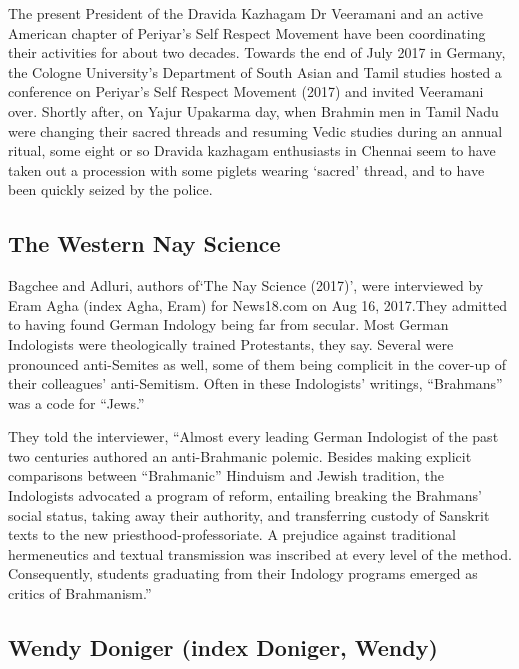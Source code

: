 \item The present President of the Dravida Kazhagam Dr Veeramani and an active American chapter of Periyar’s Self Respect Movement have been coordinating their activities for about two decades. Towards the end of July 2017 in Germany, the Cologne University’s Department of South Asian and Tamil studies hosted a conference on Periyar’s Self Respect Movement (2017) and invited Veeramani over. Shortly after, on Yajur Upakarma day, when Brahmin men in Tamil Nadu were changing their sacred threads and resuming Vedic studies during an annual ritual, some eight or so Dravida kazhagam enthusiasts in Chennai seem to have taken out a procession with some piglets wearing ‘sacred’ thread, and to have been quickly seized by the police.



\subsection{The Western Nay Science}

\item Bagchee and Adluri, authors of‘The Nay Science (2017)’, were interviewed by Eram Agha (index Agha, Eram) for News18.com on Aug 16, 2017.They admitted to having found German Indology being far from secular. Most German Indologists were theologically trained Protestants, they say. Several were pronounced anti-Semites as well, some of them being complicit in the cover-up of their colleagues’ anti-Semitism. Often in these Indologists’ writings, “Brahmans” was a code for “Jews.”

 \item They told the interviewer, “Almost every leading German Indologist of the past two centuries authored an anti-Brahmanic polemic. Besides making explicit comparisons between “Brahmanic” Hinduism and Jewish tradition, the Indologists advocated a program of reform, entailing breaking the Brahmans’ social status, taking away their authority, and transferring custody of Sanskrit texts to the new priesthood-professoriate. A prejudice against traditional hermeneutics and textual transmission was inscribed at every level of the method. Consequently, students graduating from their Indology programs emerged as critics of Brahmanism.”



\subsection{Wendy Doniger (index Doniger, Wendy)}

